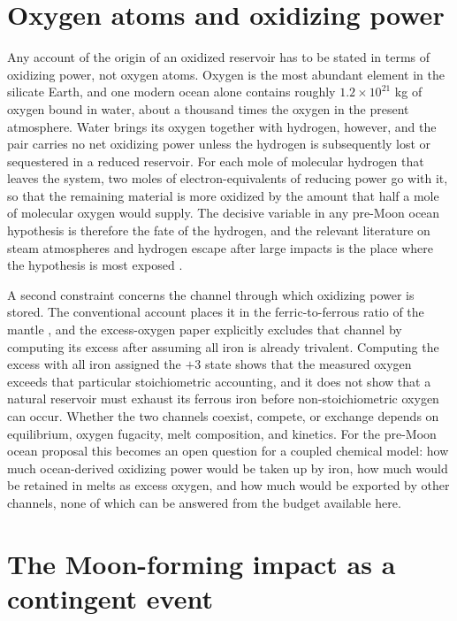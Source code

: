 \documentclass[11pt]{article}
\begin{document}
\section{Oxygen atoms and oxidizing power}

Any account of the origin of an oxidized reservoir has to be stated in terms of oxidizing power, not oxygen atoms. Oxygen is the most abundant element in the silicate Earth, and one modern ocean alone contains roughly $1.2 \times 10^{21}$ kg of oxygen bound in water, about a thousand times the oxygen in the present atmosphere. Water brings its oxygen together with hydrogen, however, and the pair carries no net oxidizing power unless the hydrogen is subsequently lost or sequestered in a reduced reservoir. For each mole of molecular hydrogen that leaves the system, two moles of electron-equivalents of reducing power go with it, so that the remaining material is more oxidized by the amount that half a mole of molecular oxygen would supply. The decisive variable in any pre-Moon ocean hypothesis is therefore the fate of the hydrogen, and the relevant literature on steam atmospheres and hydrogen escape after large impacts is the place where the hypothesis is most exposed \cite{hamano2013,sossi2020}.

A second constraint concerns the channel through which oxidizing power is stored. The conventional account places it in the ferric-to-ferrous ratio of the mantle \cite{frost2008}, and the excess-oxygen paper explicitly excludes that channel by computing its excess after assuming all iron is already trivalent. Computing the excess with all iron assigned the $+3$ state shows that the measured oxygen exceeds that particular stoichiometric accounting, and it does not show that a natural reservoir must exhaust its ferrous iron before non-stoichiometric oxygen can occur. Whether the two channels coexist, compete, or exchange depends on equilibrium, oxygen fugacity, melt composition, and kinetics. For the pre-Moon ocean proposal this becomes an open question for a coupled chemical model: how much ocean-derived oxidizing power would be taken up by iron, how much would be retained in melts as excess oxygen, and how much would be exported by other channels, none of which can be answered from the budget available here.

\section{The Moon-forming impact as a contingent event}
\end{document}
